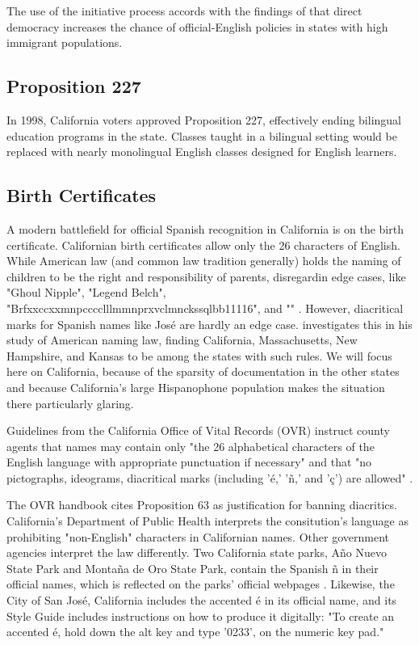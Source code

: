 The use of the initiative process accords with the findings of \textcite{liu14}
that direct democracy increases the chance of official-English policies in
states with high immigrant populations.

\subsection{Proposition 227}

In 1998, California voters approved Proposition 227, effectively ending
bilingual education programs in the state. Classes taught in a bilingual setting
would be replaced with nearly monolingual English classes designed for English
learners.

\subsection{Birth Certificates}

A modern battlefield for official Spanish recognition in California is on the
birth certificate. Californian birth certificates allow only the 26 characters
of English. While American law (and common law tradition generally) holds the
naming of children to be the right and responsibility of parents, disregardin
edge cases, like "Ghoul Nipple", "Legend Belch",
"Brfxxccxxmnpcccclllmmnprxvclmnckssqlbb11116", and "" \parencite{larson11}.
However, diacritical marks for Spanish names like José are hardly an edge case.
\textcite[5]{larson11} investigates this in his study of American naming law,
finding California, Massachusetts, New Hampshire, and Kansas to be among the
states with such rules. We will focus here on California, because of the
sparsity of documentation in the other states and because California's large
Hispanophone population makes the situation there particularly glaring.

Guidelines from the California Office of Vital Records (OVR) instruct county
agents that names may contain only "the 26 alphabetical characters of the
English language with appropriate punctuation if necessary" and that "no
pictographs, ideograms, diacritical marks (including 'é,' 'ñ,' and 'ç') are
allowed" \parencite{larson11}.

The OVR handbook cites Proposition 63 as justification for banning diacritics.
California's Department of Public Health interprets the consitution's language
as prohibiting "non-English" characters in Californian names. Other government
agencies interpret the law differently. Two California state parks, Año Nuevo
State Park and Montaña de Oro State Park, contain the Spanish ñ in their
official names, which is reflected on the parks' official webpages
\parencite{año-nuevo} \parencite{montaña-de-oro}. Likewise, the City of San
José, California includes the accented é in its official name, and its Style
Guide includes instructions on how to produce it digitally: "To create an
accented é, hold down the alt key and type '0233'‚ on the numeric key pad."
\textcite{san-josé}

